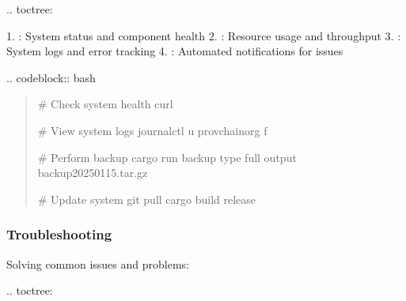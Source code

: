 \documentclass[letterpaper,10pt,english]{sphinxmanual}
\begin{document}
\sphinxAtStartPar
{}
.. toctree:

\begin{sphinxVerbatim}[commandchars=\\\{\}]
 
   

\end{sphinxVerbatim}

\sphinxAtStartPar
{}
1. : System status and component health
2. : Resource usage and throughput
3. : System logs and error tracking
4. : Automated notifications for issues

\sphinxAtStartPar
{}
.. code\sphinxhyphen{}block:: bash
\begin{quote}

\sphinxAtStartPar
\# Check system health
curl 

\sphinxAtStartPar
\# View system logs
journalctl \sphinxhyphen{}u provchain\sphinxhyphen{}org \sphinxhyphen{}f

\sphinxAtStartPar
\# Perform backup
cargo run \textendash{} backup \textendash{}type full \textendash{}output backup\sphinxhyphen{}2025\sphinxhyphen{}01\sphinxhyphen{}15.tar.gz

\sphinxAtStartPar
\# Update system
git pull
cargo build \textendash{}release
\end{quote}


\subsubsection{Troubleshooting}
\label{\detokenize{user-guide/index:troubleshooting}}
\sphinxAtStartPar
Solving common issues and problems:

\sphinxAtStartPar
{}
.. toctree:

\begin{sphinxVerbatim}[commandchars=\\\{\}]
 
 

\end{sphinxVerbatim}
\end{document}
